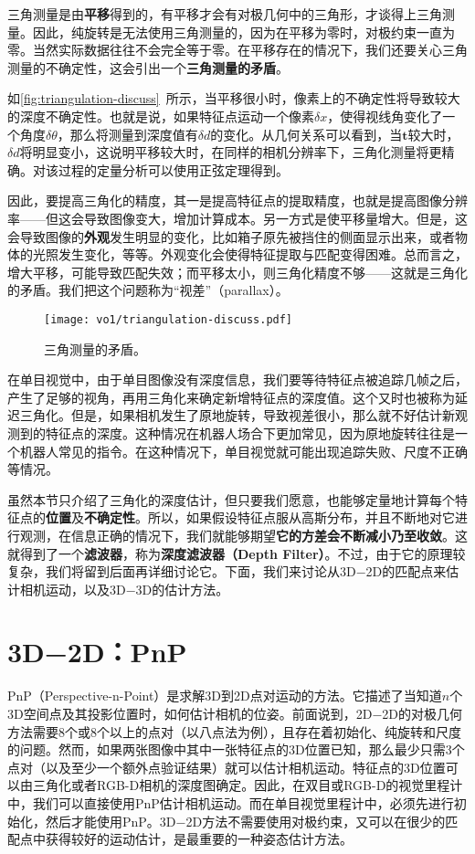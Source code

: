 三角测量是由\textbf{平移}得到的，有平移才会有对极几何中的三角形，才谈得上三角测量。因此，纯旋转是无法使用三角测量的，因为在平移为零时，对极约束一直为零。当然实际数据往往不会完全等于零。在平移存在的情况下，我们还要关心三角测量的不确定性，这会引出一个\textbf{三角测量的矛盾}。

如\autoref{fig:triangulation-discuss}~所示，当平移很小时，像素上的不确定性将导致较大的深度不确定性。也就是说，如果特征点运动一个像素$\delta x$，使得视线角变化了一个角度$\delta \theta$，那么将测量到深度值有$\delta d$的变化。从几何关系可以看到，当$\bm{t}$较大时，$\delta d$将明显变小，这说明平移较大时，在同样的相机分辨率下，三角化测量将更精确。对该过程的定量分析可以使用正弦定理得到。

因此，要提高三角化的精度，其一是提高特征点的提取精度，也就是提高图像分辨率——但这会导致图像变大，增加计算成本。另一方式是使平移量增大。但是，这会导致图像的\textbf{外观}发生明显的变化，比如箱子原先被挡住的侧面显示出来，或者物体的光照发生变化，等等。外观变化会使得特征提取与匹配变得困难。总而言之，增大平移，可能导致匹配失效；而平移太小，则三角化精度不够——这就是三角化的矛盾。我们把这个问题称为“视差”（parallax）。

\begin{figure}[!ht]
	\centering
	\texttt{[image: vo1/triangulation-discuss.pdf]}
	\caption{三角测量的矛盾。}
	\label{fig:triangulation-discuss}
\end{figure}

在单目视觉中，由于单目图像没有深度信息，我们要等待特征点被追踪几帧之后，产生了足够的视角，再用三角化来确定新增特征点的深度值。这个又时也被称为延迟三角化\textsuperscript{\cite{Davison2003}}。但是，如果相机发生了原地旋转，导致视差很小，那么就不好估计新观测到的特征点的深度。这种情况在机器人场合下更加常见，因为原地旋转往往是一个机器人常见的指令。在这种情况下，单目视觉就可能出现追踪失败、尺度不正确等情况。

虽然本节只介绍了三角化的深度估计，但只要我们愿意，也能够定量地计算每个特征点的\textbf{位置}及\textbf{不确定性}。所以，如果假设特征点服从高斯分布，并且不断地对它进行观测，在信息正确的情况下，我们就能够期望\textbf{它的方差会不断减小乃至收敛}。这就得到了一个\textbf{滤波器}，称为\textbf{深度滤波器（Depth Filter）}。不过，由于它的原理较复杂，我们将留到后面再详细讨论它。下面，我们来讨论从3D−2D的匹配点来估计相机运动，以及3D−3D的估计方法。

\section{3D−2D：PnP}
PnP（Perspective-n-Point）是求解3D到2D点对运动的方法。它描述了当知道$n$个3D空间点及其投影位置时，如何估计相机的位姿。前面说到，2D−2D的对极几何方法需要8个或8个以上的点对（以八点法为例），且存在着初始化、纯旋转和尺度的问题。然而，如果两张图像中其中一张特征点的3D位置已知，那么最少只需3个点对（以及至少一个额外点验证结果）就可以估计相机运动。特征点的3D位置可以由三角化或者RGB-D相机的深度图确定。因此，在双目或RGB-D的视觉里程计中，我们可以直接使用PnP估计相机运动。而在单目视觉里程计中，必须先进行初始化，然后才能使用PnP。3D−2D方法不需要使用对极约束，又可以在很少的匹配点中获得较好的运动估计，是最重要的一种姿态估计方法。

